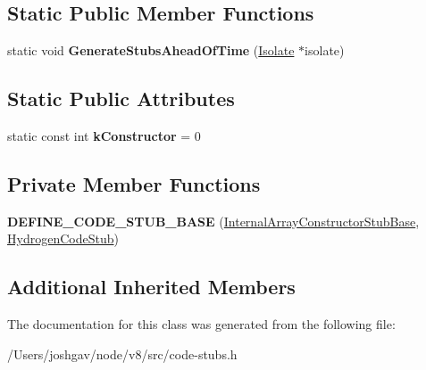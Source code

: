 \subsection*{Static Public Member Functions}
\begin{DoxyCompactItemize}
\item 
static void {\bfseries Generate\+Stubs\+Ahead\+Of\+Time} (\hyperlink{classv8_1_1internal_1_1_isolate}{Isolate} $\ast$isolate)\hypertarget{classv8_1_1internal_1_1_internal_array_constructor_stub_base_a7eb1dafd46ef9adeba9ab1c5a24b5b5c}{}\label{classv8_1_1internal_1_1_internal_array_constructor_stub_base_a7eb1dafd46ef9adeba9ab1c5a24b5b5c}

\end{DoxyCompactItemize}
\subsection*{Static Public Attributes}
\begin{DoxyCompactItemize}
\item 
static const int {\bfseries k\+Constructor} = 0\hypertarget{classv8_1_1internal_1_1_internal_array_constructor_stub_base_a65e4dc3b107482188f4cd806a9796add}{}\label{classv8_1_1internal_1_1_internal_array_constructor_stub_base_a65e4dc3b107482188f4cd806a9796add}

\end{DoxyCompactItemize}
\subsection*{Private Member Functions}
\begin{DoxyCompactItemize}
\item 
{\bfseries D\+E\+F\+I\+N\+E\+\_\+\+C\+O\+D\+E\+\_\+\+S\+T\+U\+B\+\_\+\+B\+A\+SE} (\hyperlink{classv8_1_1internal_1_1_internal_array_constructor_stub_base}{Internal\+Array\+Constructor\+Stub\+Base}, \hyperlink{classv8_1_1internal_1_1_hydrogen_code_stub}{Hydrogen\+Code\+Stub})\hypertarget{classv8_1_1internal_1_1_internal_array_constructor_stub_base_af092026721e190f06f5b6cc72d1d076c}{}\label{classv8_1_1internal_1_1_internal_array_constructor_stub_base_af092026721e190f06f5b6cc72d1d076c}

\end{DoxyCompactItemize}
\subsection*{Additional Inherited Members}


The documentation for this class was generated from the following file\+:\begin{DoxyCompactItemize}
\item 
/\+Users/joshgav/node/v8/src/code-\/stubs.\+h\end{DoxyCompactItemize}
